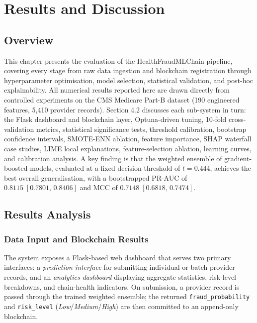 \chapter{Results and Discussion}

\section{Overview}

This chapter presents the evaluation of the HealthFraudMLChain
pipeline, covering every stage from raw data ingestion and blockchain
registration through hyperparameter optimisation, model selection, statistical
validation, and post-hoc explainability. All numerical results reported here
are drawn directly from controlled experiments on the CMS Medicare Part-B
dataset (190 engineered features, 5{,}410 provider records). Section 4.2
discusses each sub-system in turn: the Flask dashboard and blockchain layer,
Optuna-driven tuning, 10-fold cross-validation metrics, statistical significance
tests, threshold calibration, bootstrap confidence intervals, SMOTE-ENN
ablation, feature importance, SHAP waterfall case studies, LIME local
explanations, feature-selection ablation, learning curves, and calibration
analysis. A key finding is that the weighted ensemble of gradient-boosted
models, evaluated at a fixed decision threshold of $t = 0.444$, achieves
the best overall generalisation, with a bootstrapped PR-AUC of
$0.8115\;[0.7801,\,0.8406]$ and MCC of $0.7148\;[0.6818,\,0.7474]$.

\section{Results Analysis}

\subsection{Data Input and Blockchain Results}

The system exposes a Flask-based web dashboard that serves two primary
interfaces: a \emph{prediction interface} for submitting individual or
batch provider records, and an \emph{analytics dashboard} displaying
aggregate statistics, risk-level breakdowns, and chain-health indicators.
On submission, a provider record is passed through the trained weighted
ensemble; the returned \texttt{fraud\_probability} and \texttt{risk\_level}
(\textit{Low}/\textit{Medium}/\textit{High}) are then committed to an
append-only blockchain.

